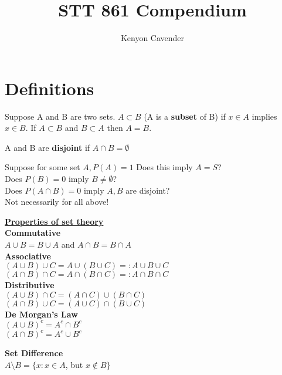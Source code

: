 \documentclass[14pt, oneside, letterpaper]{notes}
\begin{document}
\title{STT 861 Compendium}
\author{Kenyon Cavender}
\maketitle

\section*{Definitions}
\begin{mydef}
  Suppose A and B are two sets.  $A \subset B$ (A is a 
  \textbf{subset} of B) if $x \in A$ implies $x \in B$. 
  If $A \subset B$ and $B \subset A$ then $A=B$.
\end{mydef}

\begin{mydef}
  A and B are \textbf{disjoint} if $A \cap B = \emptyset$
\end{mydef}

\begin{remark}
	Suppose for some set $A, P(A) = 1$ Does this imply $A=S$? \\
	Does $P(B) = 0$ imply $B \neq \emptyset$? \\
	Does $P(A \cap B) = 0$ imply $A,B$ are disjoint? \\
	Not necessarily for all above! 
\end{remark}

\noindent \underline{\textbf{Properties of set theory}}  \\
\textbf{Commutative}  \\
\indent $A \cup B = B \cup A$ and $A \cap B = B \cap A$ \\
\textbf{Associative}\\
\indent $(A \cup B) \cup C = A \cup (B \cup C) =: A \cup B \cup C$ \\
\indent $(A \cap B) \cap C = A \cap (B \cap C) =: A \cap B \cap C$ \\
\textbf{Distributive}\\
\indent $(A \cup B) \cap C = (A \cap C) \cup (B \cap C)$ \\
\indent $(A \cap B) \cup C = (A \cup C) \cap (B \cup C)$ \\
\textbf{De Morgan's Law}\\
\indent $(A \cup B)^c = A^c \cap B^c$ \\
\indent $(A \cap B)^c = A^c \cup B^c$ 

\begin{mydef}
  \textbf{Set Difference}\\
  \indent $A \setminus B = \{x: x \in A$, but $x \notin B \}$
\end{mydef}
\end{document}
